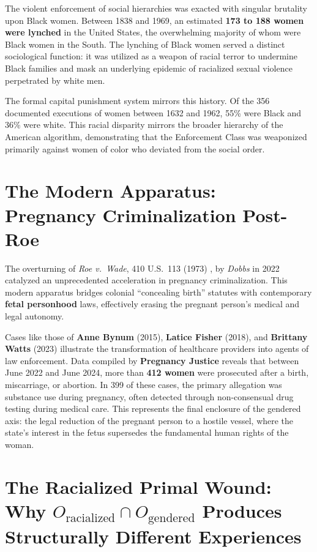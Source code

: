 The violent enforcement of social hierarchies was exacted with singular brutality upon Black women. Between 1838 and 1969, an estimated \textbf{173 to 188 women were lynched} in the United States, the overwhelming majority of whom were Black women in the South. The lynching of Black women served a distinct sociological function: it was utilized as a weapon of racial terror to undermine Black families and mask an underlying epidemic of racialized sexual violence perpetrated by white men. 

The formal capital punishment system mirrors this history. Of the 356 documented executions of women between 1632 and 1962, 55\% were Black and 36\% were white. This racial disparity mirrors the broader hierarchy of the American algorithm, demonstrating that the Enforcement Class was weaponized primarily against women of color who deviated from the social order.

\section{The Modern Apparatus: Pregnancy Criminalization Post-Roe}

The overturning of \textit{Roe v.\ Wade}, 410 U.S.\ 113 (1973) \cite{roe_v_wade}, by \textit{Dobbs} in 2022 catalyzed an unprecedented acceleration in pregnancy criminalization. This modern apparatus bridges colonial ``concealing birth'' statutes with contemporary \textbf{fetal personhood} laws, effectively erasing the pregnant person's medical and legal autonomy. 

Cases like those of \textbf{Anne Bynum} (2015), \textbf{Latice Fisher} (2018), and \textbf{Brittany Watts} (2023) illustrate the transformation of healthcare providers into agents of law enforcement. Data compiled by \textbf{Pregnancy Justice} reveals that between June 2022 and June 2024, more than \textbf{412 women} were prosecuted after a birth, miscarriage, or abortion. In 399 of these cases, the primary allegation was substance use during pregnancy, often detected through non-consensual drug testing during medical care. This represents the final enclosure of the gendered axis: the legal reduction of the pregnant person to a hostile vessel, where the state's interest in the fetus supersedes the fundamental human rights of the woman.

\section{The Racialized Primal Wound: Why $O_{\text{racialized}} \cap O_{\text{gendered}}$ Produces Structurally Different Experiences}
\label{sec:racialized_primal_wound}

